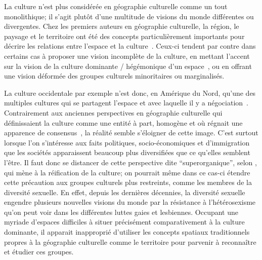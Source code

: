 La culture n'est plus considérée en géographie culturelle comme un tout monolithique; il s'agit plutôt d'une multitude de visions du monde différentes ou divergentes.
Chez les premiers auteurs en géographie culturelle, la région, le paysage et le territoire ont été des concepts particulièrement importants pour décrire les relations entre l'espace et la culture~\citep{Bonnemaison1981,Monnet1998,DiMeo1998,}.
Ceux-ci tendent par contre dans certains cas à proposer une vision incomplète de la culture, en mettant l'accent sur la vision de la culture dominante / hégémonique d'un espace~\citep[11-12]{Duncan1993}, ou en offrant une vision déformée des groupes culturels minoritaires ou marginalisés.

La culture occidentale par exemple n'est donc, en Amérique du Nord, qu'une des multiples cultures qui se partagent l'espace et avec laquelle il y a négociation~\citep[11]{Duncan1993}.
Contrairement aux anciennes perspectives en géographie culturelle qui définissaient la culture comme une entité à part, homogène et où régnait une apparence de consensus~\citep{Duncan1980}, la réalité semble s'éloigner de cette image.
C'est surtout lorsque l'on s'intéresse aux faits politiques, socio-économiques et d'immigration que les sociétés apparaissent beaucoup plus diversifiées que ce qu'elles semblent l'être.
Il faut donc se distancer de cette perspective dite \enquote{superorganique}, selon \citet[198]{Duncan1980}, qui mène à la réification de la culture; on pourrait même dans ce cas-ci étendre cette précaution aux groupes culturels plus restreints, comme les membres de la diversité sexuelle.
En effet, depuis les dernières décennies, la diversité sexuelle engendre plusieurs nouvelles visions du monde par la résistance à l'hétérosexisme qu'on peut voir dans les différentes luttes gaies et lesbiennes.
Occupant une myriade d'espaces difficiles à situer précisément comparativement à la culture dominante, il apparait inapproprié d'utiliser les concepts spatiaux traditionnels propres à la géographie culturelle comme le territoire pour parvenir à reconnaître et étudier ces groupes.

